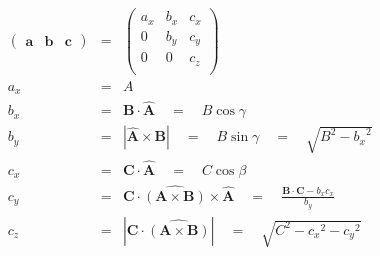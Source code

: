 \documentclass[12pt]{article}
\begin{document}
\begin{eqnarray*}
\begin{pmatrix}
\mathbf{a}  &
\mathbf{b}  &
\mathbf{c} 
\end{pmatrix}
& = &
\begin{pmatrix}
a_x & b_x & c_x \\
0 & b_y & c_y \\
0 & 0 & c_z \\
\end{pmatrix} \\
a_x &=& A \\
b_x &=& \mathbf{B} \cdot \mathbf{\hat{A}} \quad = \quad B \cos{\gamma} \\
b_y &=& |\mathbf{\hat{A}} \times \mathbf{B}| \quad = \quad B \sin{\gamma} \quad =  \quad  \sqrt{B^2 - {b_x}^2} \\
c_x &=& \mathbf{C} \cdot \mathbf{\hat{A}} \quad = \quad C \cos{\beta} \\
c_y &=& \mathbf{C} \cdot \widehat{(\mathbf{A} \times \mathbf{B})} \times \mathbf{\hat{A}} \quad = \quad \frac{\mathbf{B} \cdot \mathbf{C} - b_x c_x}{b_y} \\
c_z &=& |\mathbf{C} \cdot \widehat{(\mathbf{A} \times \mathbf{B})}|\quad = \quad \sqrt{C^2 - {c_x}^2 - {c_y}^2} \\
\end{eqnarray*}
\end{document}
